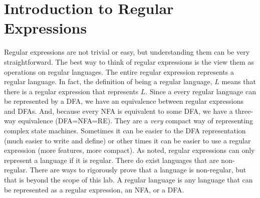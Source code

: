 \section*{Introduction to Regular Expressions}
Regular expressions are not trivial or easy, but understanding them can be very straightforward.
The best way to think of regular expressions is the view them as operations on regular languages.  The entire regular expression represents a regular language.  In fact, the definition of being a regular language, $L$ means that there is a regular expression that represents $L$.   Since a every regular language can be represented by a DFA, we have an equivalence between regular expressions and DFAs.  And, because every NFA is equivalent to some DFA, we have a three-way equivalence (DFA=NFA=RE).  They are a \emph{very} compact way of representing complex state machines.  Sometimes it can be easier to the DFA representation (much easier to write and define) or other times it can be easier to use a regular expression (more features, more compact).
As noted, regular expressions can only represent a language if it is regular.  There do exist languages that are non-regular.  There are ways to rigorously prove that a language is non-regular, but that is beyond the scope of this lab.  A regular language is any language that can be represented as a regular expression, an NFA, or a DFA.

